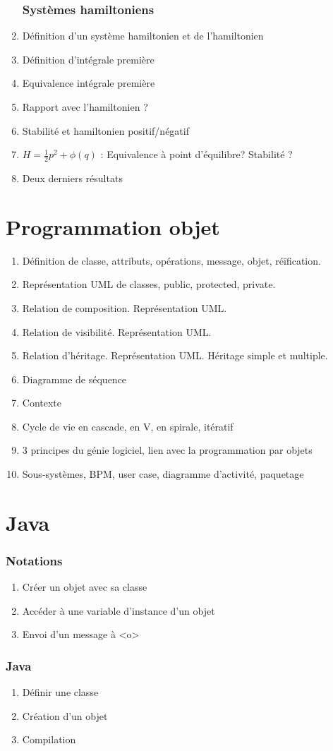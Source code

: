 \documentclass{article}
\begin{document}
\begin{enumerate}
\section{Systèmes hamiltoniens}
\item Définition d'un système hamiltonien et de l'hamiltonien
\item Définition d'intégrale première
\item Equivalence intégrale première
\item Rapport avec l'hamiltonien ?
\item Stabilité et hamiltonien positif/négatif
\item $H=\frac{1}{2}p^2+\phi(q)$ : Equivalence à point d'équilibre? Stabilité ?
\item Deux derniers résultats
\end{enumerate}

\newpage
\part{Programmation objet}
\begin{enumerate}
\item Définition de classe, attributs, opérations, message, objet, réïfication.
\item Représentation UML de classes, public, protected, private.
\item Relation de composition. Représentation UML.
\item Relation de visibilité. Représentation UML.
\item Relation d'héritage. Représentation UML. Héritage simple et multiple.
\item Diagramme de séquence
\item Contexte
\item Cycle de vie en cascade, en V, en spirale, itératif
\item 3 principes du génie logiciel, lien avec la programmation par objets
\item Sous-systèmes, BPM, user case, diagramme d'activité, paquetage
\end{enumerate}

\newpage
\part{Java}
\section{Notations}
\begin{enumerate}
\item Créer un objet avec sa classe
\item Accéder à une variable d'instance d'un objet
\item Envoi d'un message à <o>
\end{enumerate}
\section{Java}
\begin{enumerate}
\item Définir une classe
\item Création d'un objet
\item Compilation
\end{enumerate}
\end{document}
